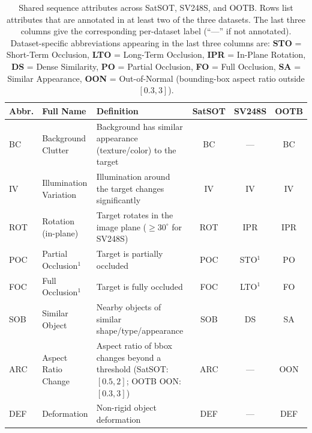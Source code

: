 
\begin{table}[t]
\centering
\caption{Shared sequence attributes across SatSOT, SV248S, and OOTB.
Rows list attributes that are annotated in at least two of the three
datasets. The last three columns give the corresponding per-dataset label
(``---'' if not annotated).
Dataset-specific abbreviations appearing in the last three columns are:
\textbf{STO} = Short-Term Occlusion,
\textbf{LTO} = Long-Term Occlusion,
\textbf{IPR} = In-Plane Rotation,
\textbf{DS} = Dense Similarity,
\textbf{PO} = Partial Occlusion,
\textbf{FO} = Full Occlusion,
\textbf{SA} = Similar Appearance,
\textbf{OON} = Out-of-Normal (bounding-box aspect ratio outside $[0.3, 3]$).}
\label{tab:shared_attributes}
\small
\setlength{\tabcolsep}{4pt}
\renewcommand{\arraystretch}{1.15}
\begin{tabular}{llp{7.4cm}ccc}
\toprule
\textbf{Abbr.} & \textbf{Full Name} & \textbf{Definition} & \textbf{SatSOT} & \textbf{SV248S} & \textbf{OOTB} \\
\midrule
BC   & Background Clutter       & Background has similar appearance (texture/color) to the target & BC  & --- & BC  \\
IV   & Illumination Variation   & Illumination around the target changes significantly           & IV  & IV  & IV  \\
ROT  & Rotation (in-plane)      & Target rotates in the image plane ($\geq 30^{\circ}$ for SV248S) & ROT & IPR & IPR \\
POC  & Partial Occlusion$^{1}$  & Target is partially occluded                                    & POC & STO$^{1}$ & PO  \\
FOC  & Full Occlusion$^{1}$     & Target is fully occluded                                        & FOC & LTO$^{1}$ & FO  \\
SOB  & Similar Object           & Nearby objects of similar shape/type/appearance                 & SOB & DS  & SA  \\
ARC  & Aspect Ratio Change      & Aspect ratio of bbox changes beyond a threshold (SatSOT: $[0.5, 2]$; OOTB OON: $[0.3, 3]$) & ARC & --- & OON \\
DEF  & Deformation              & Non-rigid object deformation                                    & DEF & --- & DEF \\
\bottomrule
\end{tabular}


\end{table}
